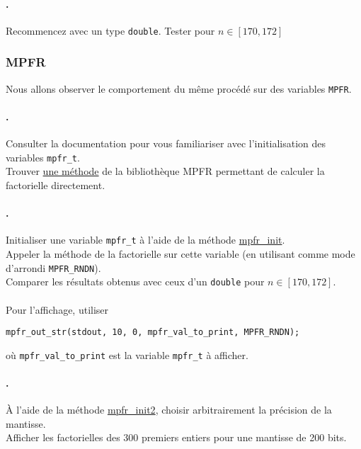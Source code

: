 \documentclass[a4paper,11pt]{exam}
\begin{document}
\paragraph{\theenumii.} 
Recommencez avec un type \verb=double=. Tester pour $n \in \left[ 170, 172 \right]$

\subsubsection{MPFR}
\setcounter{enumii}{1}
Nous allons observer le comportement du même procédé sur des variables \verb=MPFR=.
\paragraph{\theenumii.} 
Consulter la documentation pour vous familiariser avec l'initialisation des variables \verb=mpfr_t=. \\
Trouver \href{http://www.mpfr.org/mpfr-current/mpfr.html#index-mpfr_005ffac_005fui}{une méthode} de la bibliothèque MPFR permettant de calculer la factorielle directement.
\paragraph{\theenumii.} 
Initialiser une variable \verb=mpfr_t= à l'aide de la méthode \href{http://www.mpfr.org/mpfr-current/mpfr.html#index-mpfr_005finit}{mpfr\_init}.\\
Appeler la méthode de la factorielle sur cette variable (en utilisant comme mode d'arrondi \verb=MPFR_RNDN=). \\
Comparer les résultats obtenus avec ceux d'un \verb=double= pour $n \in \left[ 170, 172 \right]$.\\ \\
Pour l'affichage, utiliser
\begin{lstlisting}
mpfr_out_str(stdout, 10, 0, mpfr_val_to_print, MPFR_RNDN);
\end{lstlisting} où \verb=mpfr_val_to_print= est la variable \verb=mpfr_t= à afficher.
\paragraph{\theenumii.} 
À l'aide de la méthode \href{http://www.mpfr.org/mpfr-current/mpfr.html#index-mpfr_005finit2}{mpfr\_init2}, choisir arbitrairement la précision de la mantisse.\\
Afficher les factorielles des 300 premiers entiers pour une mantisse de 200 bits.
\end{document}

